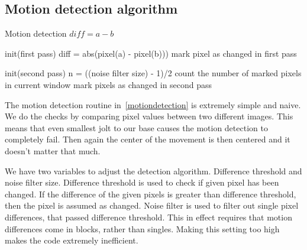 \documentclass[english,11pt,twoside,a4paper]{article}
\begin{document}
\subsection{Motion detection algorithm}

\begin{algorithm}
  \label{motiondetection}
  \caption{Motion detection $diff = a - b$}
  \begin{algorithmic}
    \STATE {}
    \STATE init(first pass)
      \STATE diff = abs(pixel(a) - pixel(b)))
        \STATE mark pixel as changed in first pass
      \ENDIF
    \ENDFOR

    \STATE {}
    \STATE init(second pass)
    \STATE n = ((noise filter size) - 1)/2
      \STATE count the number of marked pixels in current window
        \STATE mark pixels as changed in second pass
      \ENDIF
    \ENDFOR

  \end{algorithmic}
\end{algorithm}

The motion detection routine in~\ref{motiondetection} is extremely simple and naive. We do the checks by comparing pixel values between two different images. This means that even smallest jolt to our base causes the motion detection to completely fail. Then again the center of the movement is then centered and it doesn't matter that much.

We have two variables to adjust the detection algorithm. Difference threshold and noise filter size. Difference threshold is used to check if given pixel has been changed. If the difference of the given pixels is greater than difference threshold, then the pixel is assumed as changed. Noise filter is used to filter out single pixel differences, that passed difference threshold. This in effect requires that motion differences come in blocks, rather than singles. Making this setting too high makes the code extremely inefficient.
\end{document}
